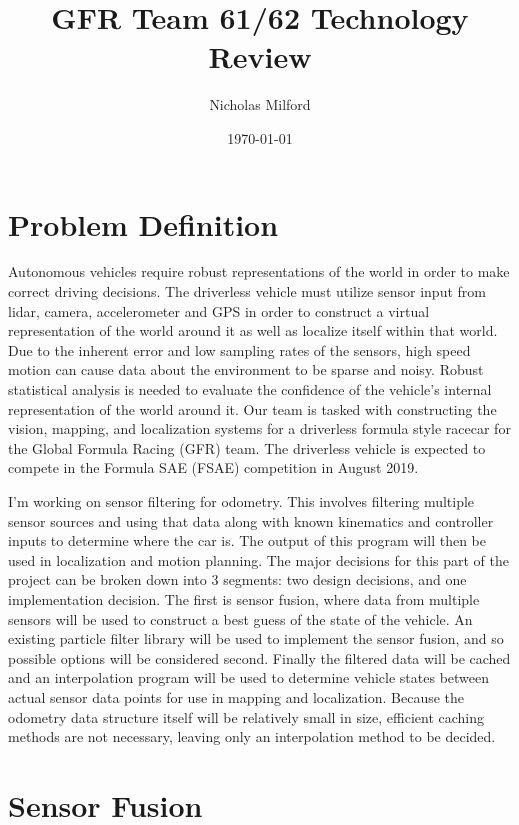 \documentclass[10pt,draftclsnofoot,onecolumn]{article}
\title{GFR Team 61/62 Technology Review}
\author{Nicholas Milford}
\date{\today}
\begin{document}
\maketitle

\thispagestyle{empty}

\section{Problem Definition}

Autonomous vehicles require robust representations of the world in order to make correct driving decisions. The driverless vehicle must utilize sensor input from lidar, camera, accelerometer and GPS in order to construct a virtual representation of the world around it as well as localize itself within that world. Due to the inherent error and low sampling rates of the sensors, high speed motion can cause data about the environment to be sparse and noisy. Robust statistical analysis is needed to evaluate the confidence of the vehicle’s internal representation of the world around it. Our team is tasked with constructing the vision, mapping, and localization systems for a driverless formula style racecar for the Global Formula Racing (GFR) team. The driverless vehicle is expected to compete in the Formula SAE (FSAE) competition in August 2019.


I’m working on sensor filtering for odometry. This involves filtering multiple sensor sources and using that data along with known kinematics and controller inputs to determine where the car is. The output of this program will then be used in localization and motion planning. The major decisions for this part of the project can be broken down into 3 segments: two design decisions, and one implementation decision. The first is sensor fusion, where data from multiple sensors will be used to construct a best guess of the state of the vehicle. An existing particle filter library will be used to implement the sensor fusion, and so possible options will be considered second. Finally the filtered data will be cached and an interpolation program will be used to determine vehicle states between actual sensor data points for use in mapping and localization. Because the odometry data structure itself will be relatively small in size, efficient caching methods are not necessary, leaving only an interpolation method to be decided.

\section{Sensor Fusion}
\end{document}
